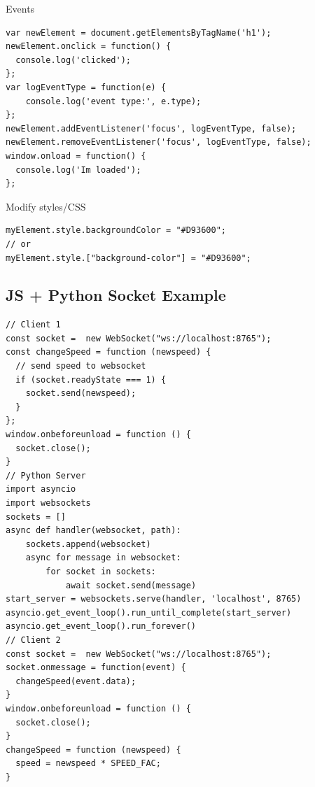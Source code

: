 \documentclass[11pt]{article}
\begin{document}
Events
\begin{verbatim}
var newElement = document.getElementsByTagName('h1');
newElement.onclick = function() {
  console.log('clicked');
};
var logEventType = function(e) {
    console.log('event type:', e.type);
};
newElement.addEventListener('focus', logEventType, false);
newElement.removeEventListener('focus', logEventType, false);
window.onload = function() {
  console.log('Im loaded');
};
\end{verbatim}
Modify styles/CSS
\begin{verbatim}
myElement.style.backgroundColor = "#D93600";
// or
myElement.style.["background-color"] = "#D93600";
\end{verbatim}
\subsection{JS + Python Socket Example}
\label{sec:org671e19c}
\begin{verbatim}
// Client 1
const socket =  new WebSocket("ws://localhost:8765");
const changeSpeed = function (newspeed) {
  // send speed to websocket 
  if (socket.readyState === 1) {
    socket.send(newspeed);
  }
};
window.onbeforeunload = function () {
  socket.close();
}
// Python Server
import asyncio
import websockets
sockets = []
async def handler(websocket, path):
    sockets.append(websocket)
    async for message in websocket:
        for socket in sockets:
            await socket.send(message)
start_server = websockets.serve(handler, 'localhost', 8765)
asyncio.get_event_loop().run_until_complete(start_server)
asyncio.get_event_loop().run_forever()
// Client 2
const socket =  new WebSocket("ws://localhost:8765");
socket.onmessage = function(event) {
  changeSpeed(event.data);
}
window.onbeforeunload = function () {
  socket.close();
}
changeSpeed = function (newspeed) {
  speed = newspeed * SPEED_FAC;
}
\end{verbatim}
\end{document}
